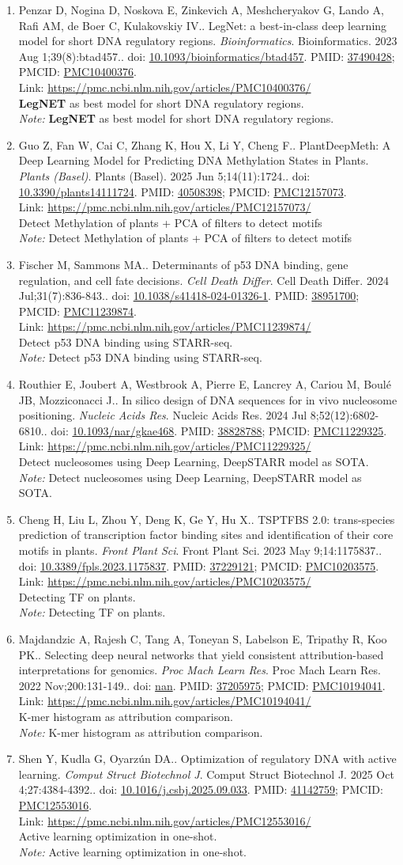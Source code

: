 \documentclass[12pt]{article}
\newcommand{\Pub}[9]{%
  \item #1. #2. \textit{#3}. #4. doi: \href{https://doi.org/#5}{#5}. PMID: \href{https://pubmed.ncbi.nlm.nih.gov/#6/}{#6}; PMCID: \href{https://www.ncbi.nlm.nih.gov/pmc/articles/#7/}{#7}. \\
  \noindent Link: \url{#8}\\
  \ifx#9\relax\else\\\textit{Note:} #9\fi
}
\begin{document}
\begin{enumerate}[leftmargin=*,label=\textbf{\arabic*.}]
\Pub{Penzar D, Nogina D, Noskova E, Zinkevich A, Meshcheryakov G, Lando A, Rafi AM, de Boer C, Kulakovskiy IV.}{LegNet: a best-in-class deep learning model for short DNA regulatory regions}{Bioinformatics}{Bioinformatics. 2023 Aug 1;39(8):btad457.}{10.1093/bioinformatics/btad457}{37490428}{PMC10400376}{https://pmc.ncbi.nlm.nih.gov/articles/PMC10400376/}{\textbf{LegNET} as best model for short DNA regulatory regions.}

\newpage


\Pub{Guo Z, Fan W, Cai C, Zhang K, Hou X, Li Y, Cheng F.}{PlantDeepMeth: A Deep Learning Model for Predicting DNA Methylation States in Plants}{Plants (Basel)}{Plants (Basel). 2025 Jun 5;14(11):1724.}{10.3390/plants14111724}{40508398}{PMC12157073}{https://pmc.ncbi.nlm.nih.gov/articles/PMC12157073/}{Detect Methylation of plants + PCA of filters to detect motifs}

\Pub{Fischer M, Sammons MA.}{Determinants of p53 DNA binding, gene regulation, and cell fate decisions}{Cell Death Differ}{Cell Death Differ. 2024 Jul;31(7):836-843.}{10.1038/s41418-024-01326-1}{38951700}{PMC11239874}{https://pmc.ncbi.nlm.nih.gov/articles/PMC11239874/}{Detect p53 DNA binding using STARR-seq.}

\Pub{Routhier E, Joubert A, Westbrook A, Pierre E, Lancrey A, Cariou M, Boulé JB, Mozziconacci J.}{In silico design of DNA sequences for in vivo nucleosome positioning}{Nucleic Acids Res}{Nucleic Acids Res. 2024 Jul 8;52(12):6802-6810.}{10.1093/nar/gkae468}{38828788}{PMC11229325}{https://pmc.ncbi.nlm.nih.gov/articles/PMC11229325/}{Detect nucleosomes using Deep Learning, DeepSTARR model as SOTA.}

\Pub{Cheng H, Liu L, Zhou Y, Deng K, Ge Y, Hu X.}{TSPTFBS 2.0: trans-species prediction of transcription factor binding sites and identification of their core motifs in plants}{Front Plant Sci}{Front Plant Sci. 2023 May 9;14:1175837.}{10.3389/fpls.2023.1175837}{37229121}{PMC10203575}{https://pmc.ncbi.nlm.nih.gov/articles/PMC10203575/}{Detecting TF on plants.}

\Pub{Majdandzic A, Rajesh C, Tang A, Toneyan S, Labelson E, Tripathy R, Koo PK.}{Selecting deep neural networks that yield consistent attribution-based interpretations for genomics}{Proc Mach Learn Res}{Proc Mach Learn Res. 2022 Nov;200:131-149.}{nan}{37205975}{PMC10194041}{https://pmc.ncbi.nlm.nih.gov/articles/PMC10194041/}{K-mer histogram as attribution comparison.}

\Pub{Shen Y, Kudla G, Oyarzún DA.}{Optimization of regulatory DNA with active learning}{Comput Struct Biotechnol J}{Comput Struct Biotechnol J. 2025 Oct 4;27:4384-4392.}{10.1016/j.csbj.2025.09.033}{41142759}{PMC12553016}{https://pmc.ncbi.nlm.nih.gov/articles/PMC12553016/}{Active learning optimization in one-shot.}


\end{enumerate}
\end{document}

